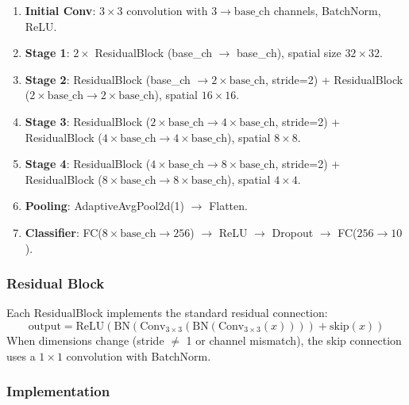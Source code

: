 \documentclass[11pt,a4paper]{article}
\begin{document}
\begin{enumerate}
    \item \textbf{Initial Conv}: $3\times3$ convolution with $3 \rightarrow \text{base\_ch}$ channels, BatchNorm, ReLU.
    \item \textbf{Stage 1}: $2\times$ ResidualBlock (base\_ch $\rightarrow$ base\_ch), spatial size $32\times32$.
    \item \textbf{Stage 2}: ResidualBlock (base\_ch $\rightarrow 2\times\text{base\_ch}$, stride=2) + ResidualBlock ($2\times\text{base\_ch} \rightarrow 2\times\text{base\_ch}$), spatial $16\times16$.
    \item \textbf{Stage 3}: ResidualBlock ($2\times\text{base\_ch} \rightarrow 4\times\text{base\_ch}$, stride=2) + ResidualBlock ($4\times\text{base\_ch} \rightarrow 4\times\text{base\_ch}$), spatial $8\times8$.
    \item \textbf{Stage 4}: ResidualBlock ($4\times\text{base\_ch} \rightarrow 8\times\text{base\_ch}$, stride=2) + ResidualBlock ($8\times\text{base\_ch} \rightarrow 8\times\text{base\_ch}$), spatial $4\times4$.
    \item \textbf{Pooling}: AdaptiveAvgPool2d(1) $\rightarrow$ Flatten.
    \item \textbf{Classifier}: FC($8\times\text{base\_ch} \rightarrow 256$) $\rightarrow$ ReLU $\rightarrow$ Dropout $\rightarrow$ FC($256 \rightarrow 10$).
\end{enumerate}

\subsubsection{Residual Block}

Each ResidualBlock implements the standard residual connection:
\begin{equation}
    \text{output} = \text{ReLU}(\text{BN}(\text{Conv}_{3\times3}(\text{BN}(\text{Conv}_{3\times3}(x)))) + \text{skip}(x))
\end{equation}
When dimensions change (stride $\neq$ 1 or channel mismatch), the skip connection uses a $1\times1$ convolution with BatchNorm.

\subsubsection{Implementation}
\end{document}
